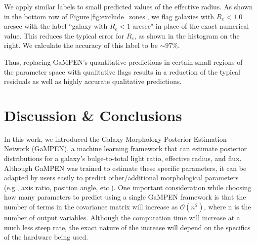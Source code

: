 \documentclass[twocolumn]{aastex63}
\newcommand\gampen{GaMPEN}
\begin{document}
\begin{CJK*}{UTF8}{gbsn}
We apply similar labels to small predicted values of the effective radius. As shown in the bottom row of Figure\,\ref{fig:exclude_zones}, we flag galaxies with $R_e < 1.0$ arcsec with the label ``galaxy with $R_e < 1$ arcsec" in place of the exact numerical value. %
This reduces the typical error for $R_e$, as shown in the histogram on the right. We calculate the accuracy of this label to be $\sim97\%$.

Thus, replacing \gampen's quantitative predictions in certain small regions of the parameter space with qualitative flags results in a reduction of the typical residuals as well as highly accurate qualitative predictions.



\section{Discussion \& Conclusions} \label{sec:conclusions}
In this work, we introduced the Galaxy Morphology Posterior Estimation Network (\gampen{}), a machine learning framework that can estimate posterior distributions for a galaxy's bulge-to-total light ratio, effective radius, and flux. Although \gampen{} was trained to estimate these specific parameters, it can be adapted by users easily to predict other/additional morphological parameters (e.g., axis ratio, position angle, etc.). One important consideration while choosing how many parameters to predict using a single \gampen{} framework is that the number of terms in the covariance matrix will increase as $\mathcal{O}(n^2)$, where n is the number of output variables. Although the computation time will increase at a much less steep rate, the exact nature of the increase will depend on the specifics of the hardware being used.



\end{CJK*}
\end{document}
